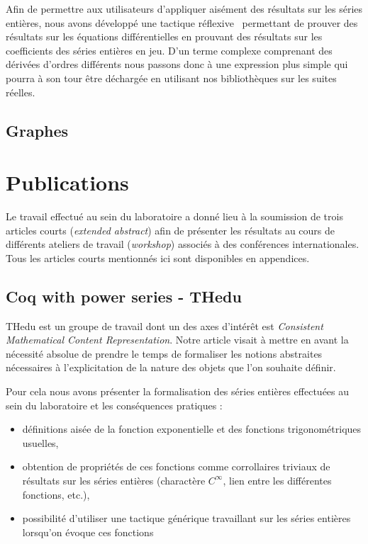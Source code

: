\documentclass[11pt]{article}
\begin{document}
Afin de permettre aux utilisateurs d'appliquer aisément des résultats sur les séries
entières, nous avons développé une tactique réflexive~\cite{reflection} permettant
de prouver des résultats sur les équations différentielles en prouvant des résultats
sur les coefficients des séries entières en jeu.
D'un terme complexe comprenant des dérivées d'ordres différents nous passons donc
à une expression plus simple qui pourra à son tour être déchargée en utilisant nos
bibliothèques sur les suites réelles.

\subsection{Graphes}

\section{Publications}

Le travail effectué au sein du laboratoire \coqtail{} a donné lieu à la soumission
de trois articles courts (\textit{extended abstract}) afin de présenter les résultats
au cours de différents ateliers de travail (\textit{workshop}) associés à des
conférences internationales. Tous les articles courts mentionnés ici sont disponibles
en appendices.

\subsection{Coq with power series - THedu}

THedu est un groupe de travail dont un des axes d'intérêt est \textit{Consistent
Mathematical Content Representation}. Notre article visait à mettre en avant la
nécessité absolue de prendre le temps de formaliser les notions abstraites nécessaires
à l'explicitation de la nature des objets que l'on souhaite définir.

Pour cela nous avons présenter la formalisation des séries entières effectuées au
sein du laboratoire et les conséquences pratiques :
\begin{itemize}
 \item définitions aisée de la fonction exponentielle et des fonctions
 trigonométriques usuelles,
 \item obtention de propriétés de ces fonctions comme corrollaires triviaux
 de résultats sur les séries entières (charactère $C^{\infty}$, lien entre les
 différentes fonctions, etc.),
 \item possibilité d'utiliser une tactique générique travaillant sur les séries
 entières lorsqu'on évoque ces fonctions
\end{itemize}
\end{document}
